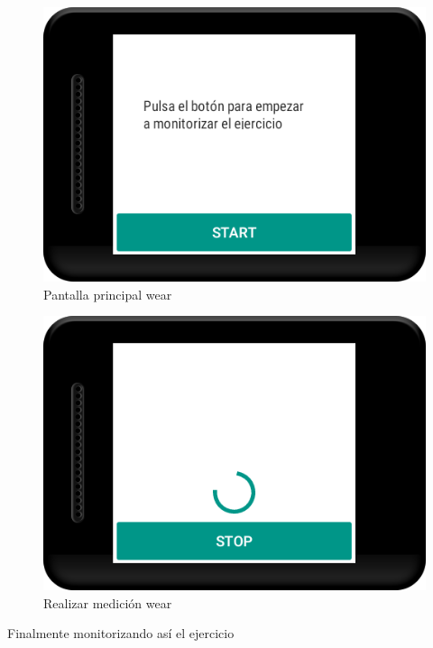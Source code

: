 \begin{figure}[H]
	\centering
	\includegraphics[scale=0.3]{imagenes/w1.png}
	\caption{Pantalla principal wear}
	\label{Realización ejercicio 5}
\end{figure}

\begin{figure}[H]
	\centering
	\includegraphics[scale=0.3]{imagenes/w2.png}
	\caption{Realizar medición wear}
	\label{Realización ejercicio 6}
\end{figure}


Finalmente monitorizando así el ejercicio

